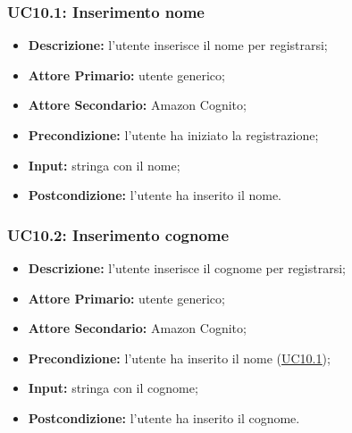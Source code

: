 \subsubsection{UC10.1: Inserimento nome}
\label{sec:UC10.1}
\begin{itemize}
    \item \textbf{Descrizione:} l'utente inserisce il nome per registrarsi;
    \item \textbf{Attore Primario:} utente generico;
    \item \textbf{Attore Secondario:} Amazon Cognito;
    \item \textbf{Precondizione:} l'utente ha iniziato la registrazione;
    \item \textbf{Input:} stringa con il nome;
    \item \textbf{Postcondizione:} l'utente ha inserito il nome. 
\end{itemize}

\subsubsection{UC10.2: Inserimento cognome}
\label{sec:UC10.2}
\begin{itemize}
    \item \textbf{Descrizione:} l'utente inserisce il cognome per registrarsi;
    \item \textbf{Attore Primario:} utente generico;
    \item \textbf{Attore Secondario:} Amazon Cognito;
    \item \textbf{Precondizione:} l'utente ha inserito il nome (\hyperref[sec:UC10.1]{\underline{UC10.1}});
    \item \textbf{Input:} stringa con il cognome;
    \item \textbf{Postcondizione:} l'utente ha inserito il cognome. 
\end{itemize}

